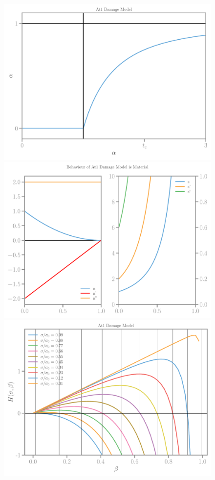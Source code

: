 \documentclass[]{article}
\begin{document}
\begin{figure}[htbp]
  \centering
  \includegraphics[width=.33\textheight]{../figures/at1-alpha-homog.pdf}
  \includegraphics[width=.33\textheight]{../figures/at1-model.pdf}
  \includegraphics[width=.33\textheight]{../figures/at1-Hbeta.pdf}

\end{figure}
\end{document}
